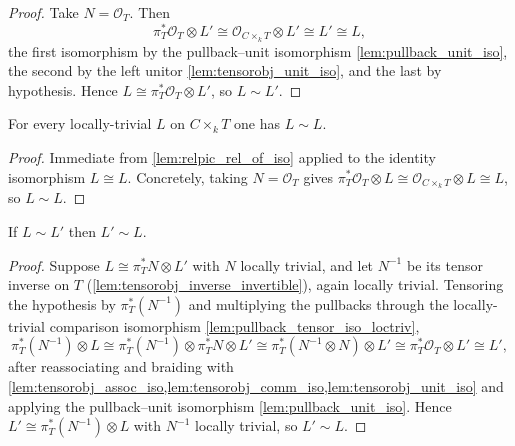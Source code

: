 \begin{proof}
  \leanok
  Take \(N = \mathcal{O}_T\). Then
  \[
    \pi_T^* \mathcal{O}_T \otimes L'
      \cong \mathcal{O}_{C \times_k T} \otimes L'
      \cong L' \cong L ,
  \]
  the first isomorphism by the pullback--unit isomorphism
  \cref{lem:pullback_unit_iso}, the second by the left unitor
  \cref{lem:tensorobj_unit_iso}, and the last by hypothesis. Hence
  \(L \cong \pi_T^* \mathcal{O}_T \otimes L'\), so \(L \sim L'\).
\end{proof}

\begin{lemma}\leanok
  \label{lem:relpic_setoid_refl}
  For every locally-trivial \(L\) on \(C \times_k T\) one has \(L \sim L\).
\end{lemma}

\begin{proof}
  Immediate from \cref{lem:relpic_rel_of_iso} applied to the identity
  isomorphism \(L \cong L\). Concretely, taking \(N = \mathcal{O}_T\) gives
  \(\pi_T^* \mathcal{O}_T \otimes L \cong \mathcal{O}_{C \times_k T} \otimes L
  \cong L\), so \(L \sim L\).
\leanok
\end{proof}

\begin{lemma}\leanok
  \label{lem:relpic_setoid_symm}
  If \(L \sim L'\) then \(L' \sim L\).
\end{lemma}

\begin{proof}
  Suppose \(L \cong \pi_T^* N \otimes L'\) with \(N\) locally trivial, and let
  \(N^{-1}\) be its tensor inverse on \(T\)
  (\cref{lem:tensorobj_inverse_invertible}), again locally trivial. Tensoring
  the hypothesis by \(\pi_T^*(N^{-1})\) and multiplying the pullbacks through
  the locally-trivial comparison isomorphism
  \cref{lem:pullback_tensor_iso_loctriv},
  \[
    \pi_T^*(N^{-1}) \otimes L
      \cong \pi_T^*(N^{-1}) \otimes \pi_T^* N \otimes L'
      \cong \pi_T^*(N^{-1} \otimes N) \otimes L'
      \cong \pi_T^* \mathcal{O}_T \otimes L'
      \cong L' ,
  \]
  after reassociating and braiding with
  \cref{lem:tensorobj_assoc_iso,lem:tensorobj_comm_iso,lem:tensorobj_unit_iso}
  and applying the pullback--unit isomorphism \cref{lem:pullback_unit_iso}.
  Hence \(L' \cong \pi_T^*(N^{-1}) \otimes L\) with \(N^{-1}\) locally trivial,
  so \(L' \sim L\).
\leanok
\end{proof}

